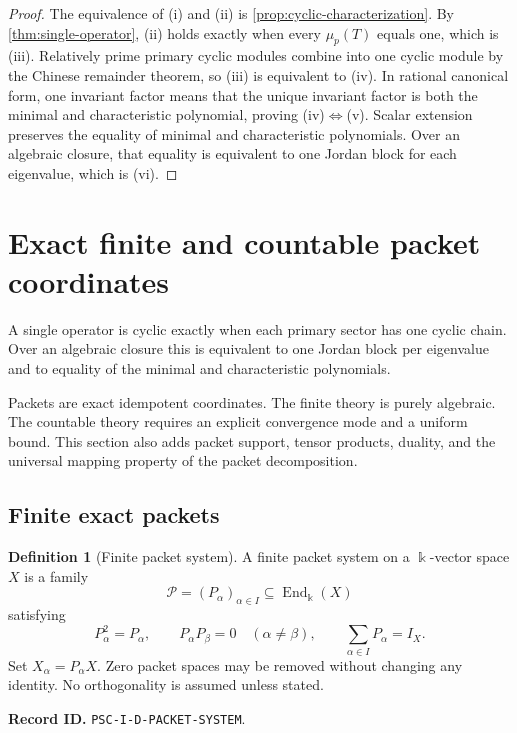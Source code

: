 \documentclass[11pt]{article}
\theoremstyle{definition}
\newtheorem{definition}[definition]{Definition}
\theoremstyle{remark}
\newcommand{\bbk}{\Bbbk}
\newcommand{\Pcal}{\mathcal P}
\newcommand{\End}{\operatorname{End}}
\newcommand{\RecordID}[1]{\par\smallskip\noindent\begingroup\footnotesize\color{PSCGray}\raggedright\textbf{Record ID.} \nolinkurl{#1}.\par\endgroup}
\begin{document}
\begin{proof}
The equivalence of (i) and (ii) is \cref{prop:cyclic-characterization}.  By \cref{thm:single-operator}, (ii) holds exactly when every $\mu_p(T)$ equals one, which is (iii).  Relatively prime primary cyclic modules combine into one cyclic module by the Chinese remainder theorem, so (iii) is equivalent to (iv).  In rational canonical form, one invariant factor means that the unique invariant factor is both the minimal and characteristic polynomial, proving (iv)$\Leftrightarrow$(v).  Scalar extension preserves the equality of minimal and characteristic polynomials.  Over an algebraic closure, that equality is equivalent to one Jordan block for each eigenvalue, which is (vi).
\end{proof}

\section{Exact finite and countable packet coordinates}

\begin{sectionrecap}
A single operator is cyclic exactly when each primary sector has one cyclic chain.  Over an algebraic closure this is equivalent to one Jordan block per eigenvalue and to equality of the minimal and characteristic polynomials.
\end{sectionrecap}

\begin{readerroadmap}
Packets are exact idempotent coordinates.  The finite theory is purely algebraic.  The countable theory requires an explicit convergence mode and a uniform bound.  This section also adds packet support, tensor products, duality, and the universal mapping property of the packet decomposition.
\end{readerroadmap}
\subsection{Finite exact packets}

\begin{definition}[Finite packet system]
\label{def:packet-system}
A finite packet system on a $\bbk$-vector space $X$ is a family
\[
\Pcal=(P_\alpha)_{\alpha\in I}\subseteq\End_{\bbk}(X)
\]
satisfying
\[
P_\alpha^2=P_\alpha,
\qquad
P_\alpha P_\beta=0\quad(\alpha\neq\beta),
\qquad
\sum_{\alpha\in I}P_\alpha=I_X.
\]
Set $X_\alpha=P_\alpha X$.  Zero packet spaces may be removed without changing any identity.  No orthogonality is assumed unless stated.
\end{definition}
\RecordID{PSC-I-D-PACKET-SYSTEM}
\end{document}
